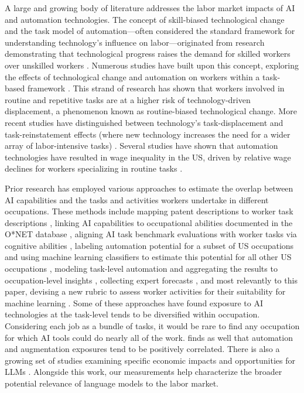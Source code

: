 \documentclass[11pt]{article}
\begin{document}
A large and growing body of literature addresses the labor market impacts of AI and automation technologies. The concept of skill-biased technological change and the task model of automation—often considered the standard framework for understanding technology's influence on labor—originated from research demonstrating that technological progress raises the demand for skilled workers over unskilled workers \citep{katz1992changes}. Numerous studies have built upon this concept, exploring the effects of technological change and automation on workers within a task-based framework \citep{autor2003skill, acemoglu_autor_2011, acemoglu2018race}. This strand of research has shown that workers involved in routine and repetitive tasks are at a higher risk of technology-driven displacement, a phenomenon known as routine-biased technological change. More recent studies have distinguished between technology's task-displacement and task-reinstatement effects (where new technology increases the need for a wider array of labor-intensive tasks) \citep{acemoglu2018race, acemoglu2019automation}. Several studies have shown that automation technologies have resulted in wage inequality in the US, driven by relative wage declines for workers specializing in routine tasks \citep{autor2006polarization, van2011wage, acemoglu2022tasks}. 

Prior research has employed various approaches to estimate the overlap between AI capabilities and the tasks and activities workers undertake in different occupations. These methods include mapping patent descriptions to worker task descriptions \citep{Webb2020, meindl2021exposure}, linking AI capabilities to occupational abilities documented in the O*NET database \citep{SeamansRajFelten2018, felten2023will}, aligning AI task benchmark evaluations with worker tasks via cognitive abilities \citep{Tolan2021}, labeling automation potential for a subset of US occupations and using machine learning classifiers to estimate this potential for all other US occupations \citep{FreyOsborne2017}, modeling task-level automation and aggregating the results to occupation-level insights \citep{arntz2017revisiting}, collecting expert forecasts \citep{grace2018will}, and most relevantly to this paper, devising a new rubric to assess worker activities for their suitability for machine learning \citep{Brynjolfsson2018, brynjolfssonQuantifyingDistributionMachine2023}. Some of these approaches have found exposure to AI technologies at the task-level tends to be diversified within occupation. Considering each job as a bundle of tasks, it would be rare to find any occupation for which AI tools could do nearly all of the work. \citep{autor2022new} finds as well that automation and augmentation exposures tend to be positively correlated. There is also a growing set of studies examining specific economic impacts and opportunities for LLMs \citep{bommasani2021opportunities, felten2023will, korinek2023language, mollick2022new, noy2023experimental, peng2023impact}. Alongside this work, our measurements help characterize the broader potential relevance of language models to the labor market. 
\end{document}
